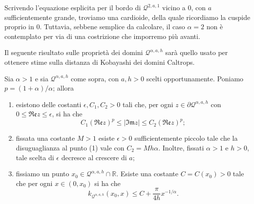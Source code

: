 \begin{oss}
    Scrivendo l'equazione esplicita per il bordo di $\mathcal{Q}^{2,a,1}$ vicino a $0$, con $a$ sufficientemente grande, troviamo una cardioide, della quale ricordiamo la cuspide proprio in $0$. Tuttavia, sebbene semplice da calcolare, il caso $\alpha=2$ non è contemplato per via di una costrizione che imporremo più avanti.
\end{oss}

Il seguente risultato sulle proprietà dei domini $\mathcal{Q}^{\alpha,a,h}$ sarà quello usato per ottenere stime sulla distanza di Kobayashi dei domini Caltrops.

\begin{prop} \label{qaah_biolo}
    Sia $\alpha>1$ e sia $\mathcal{Q}^{\alpha,a,h}$ come sopra, con $a,h>0$ scelti opportunamente. Poniamo $p=(1+\alpha)/\alpha$; allora
    \begin{enumerate}[label={(\arabic*)}]
        \item esistono delle costanti $\epsilon,C_1,C_2>0$ tali che, per ogni $z\in\partial\mathcal{Q}^{\alpha,a,h}$ con $0\le\mathfrak{Re}z\le\epsilon$, si ha che
        $$C_1(\mathfrak{Re}z)^p \le |\mathfrak{Im}z| \le C_2(\mathfrak{Re}z)^p;$$
        \item fissata una costante $M>1$ esiste $\epsilon>0$ sufficientemente piccolo tale che la disuguaglianza al punto (1) vale con $C_2=Mh\alpha$. Inoltre, fissati $\alpha>1$ e $h>0$, tale scelta di $\epsilon$ decresce al crescere di $a$;
        \item fissiamo un punto $x_0\in\mathcal{Q}^{\alpha,a,h}\cap\mathbb{R}$. Esiste una costante $C=C(x_0)>0$ tale che per ogni $x\in(0,x_0)$ si ha che
        $$k_{\mathcal{Q}^{\alpha,a,h}}(x_0,x) \le C+\frac{\pi}{4h}x^{-1/\alpha}.$$
    \end{enumerate}
\end{prop}

